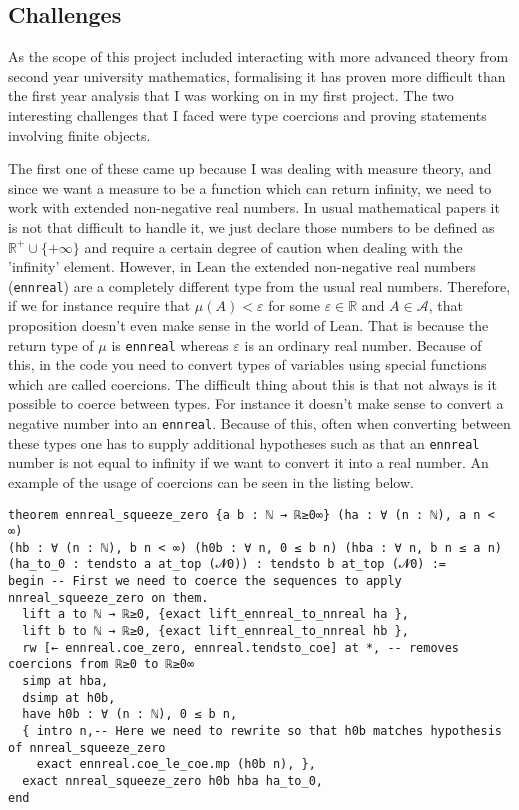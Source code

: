 \documentclass[11pt]{article}
\newenvironment{code}{\captionsetup{type=listing}}{}
\newcommand\R{\mathbb{R}}
\newcommand\A{\mathcal{A}}
\begin{document}
\subsection*{Challenges}

As the scope of this project included interacting with more advanced theory
from second year university mathematics, formalising it has proven more difficult
than the first year analysis that I was working on in my first project. The two
interesting challenges that I faced were type coercions and proving
statements involving finite objects.

The first one of these came up because I
was dealing with measure theory, and since we want a measure to be a function which
can return infinity, we need to work with extended non-negative real numbers.
In usual mathematical papers it is not that difficult to handle it, we just declare
those numbers to be defined as $\R^+ \cup \lbrace+\infty\rbrace$ and require a
certain degree of caution when dealing with the 'infinity' element. However, in
Lean the extended non-negative real numbers (\texttt{ennreal}) are a completely
different type from the usual real numbers. Therefore, if we for instance require
that $\mu (A) < \varepsilon $ for some  $\varepsilon \in \R $ and  $A \in \A$, that
proposition doesn't even make sense in the world of Lean. That is because the return
type of $\mu$ is \texttt{ennreal} whereas  $\varepsilon$ is an ordinary real number. Because
of this, in the code you need to convert types of variables using special functions
which are called coercions. The difficult thing about this is that not always is
it possible to coerce between types. For instance it doesn't make sense to convert
a negative number into an  \texttt{ennreal}. Because of this, often when converting
between these types one has to supply additional hypotheses such as that an
\texttt{ennreal} number is not equal to infinity if we want to convert it into
a real number. An example of the usage of coercions can be seen in the listing below.
\begin{code}
\begin{verbatim}
theorem ennreal_squeeze_zero {a b : ℕ → ℝ≥0∞} (ha : ∀ (n : ℕ), a n < ∞)
(hb : ∀ (n : ℕ), b n < ∞) (h0b : ∀ n, 0 ≤ b n) (hba : ∀ n, b n ≤ a n)
(ha_to_0 : tendsto a at_top (𝓝0)) : tendsto b at_top (𝓝0) :=
begin -- First we need to coerce the sequences to apply nnreal_squeeze_zero on them.
  lift a to ℕ → ℝ≥0, {exact lift_ennreal_to_nnreal ha },
  lift b to ℕ → ℝ≥0, {exact lift_ennreal_to_nnreal hb },
  rw [← ennreal.coe_zero, ennreal.tendsto_coe] at *, -- removes coercions from ℝ≥0 to ℝ≥0∞
  simp at hba,
  dsimp at h0b,
  have h0b : ∀ (n : ℕ), 0 ≤ b n,
  { intro n,-- Here we need to rewrite so that h0b matches hypothesis of nnreal_squeeze_zero
    exact ennreal.coe_le_coe.mp (h0b n), },
  exact nnreal_squeeze_zero h0b hba ha_to_0,
end
\end{verbatim}
\end{code}
\end{document}

